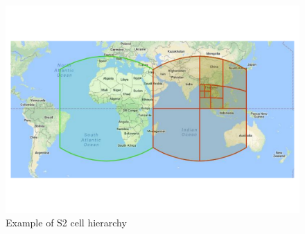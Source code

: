 \begin{figure}[htbp]
    \centering
    \includegraphics[width=\textwidth]{Chapters/benchmark/figures/s2_cells.pdf}
    \caption{Example of S2 cell hierarchy}
    \label{fig:pouchbeasts-s2cells}
\end{figure}